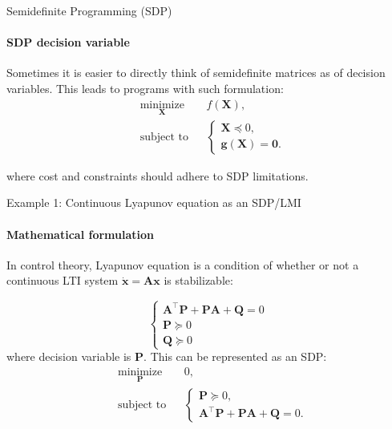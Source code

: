 \documentclass{beamer}
\begin{document}
\begin{frame}{Semidefinite Programming (SDP)}
\framesubtitle{SDP decision variable}
\begin{flushleft}

Sometimes it is easier to directly think of semidefinite matrices as of decision variables. This leads to programs with such formulation:
%
\begin{equation}
\begin{aligned}
& \underset{\mathbf{X}}{\text{minimize}}
& & f(\mathbf{X}), \\
& \text{subject to}
& & \begin{cases}
    \mathbf{X} \preceq 0, \\
    \mathbf{g}(\mathbf{X}) = \mathbf{0}.
    \end{cases}
\end{aligned}
\end{equation}

where cost and constraints should adhere to SDP limitations.

\end{flushleft}
\end{frame}



\begin{frame}{Example 1: Continuous Lyapunov equation as an SDP/LMI}
\framesubtitle{Mathematical formulation}
\begin{flushleft}

In control theory, Lyapunov equation is a condition of whether or not a continuous LTI system $\dot{\mathbf{x}} = \mathbf{A}\mathbf{x}$ is stabilizable:

\begin{equation}
    \begin{cases}
        \mathbf{A}^\top\mathbf{P} + \mathbf{P}\mathbf{A} + \mathbf{Q} = 0 \\
        \mathbf{P} \succeq 0 \\
        \mathbf{Q} \succeq 0 
    \end{cases}
\end{equation}
%
where decision variable is $\mathbf{P}$. This can be represented as an SDP:
%
\begin{equation}
\begin{aligned}
& \underset{\mathbf{P}}{\text{minimize}}
& & 0, \\
& \text{subject to}
& & \begin{cases}
    \mathbf{P} \succeq 0, \\
    \mathbf{A}^\top\mathbf{P} + \mathbf{P}\mathbf{A} + \mathbf{Q} = 0.
    \end{cases}
\end{aligned}
\end{equation}


\end{flushleft}
\end{frame}
\end{document}
